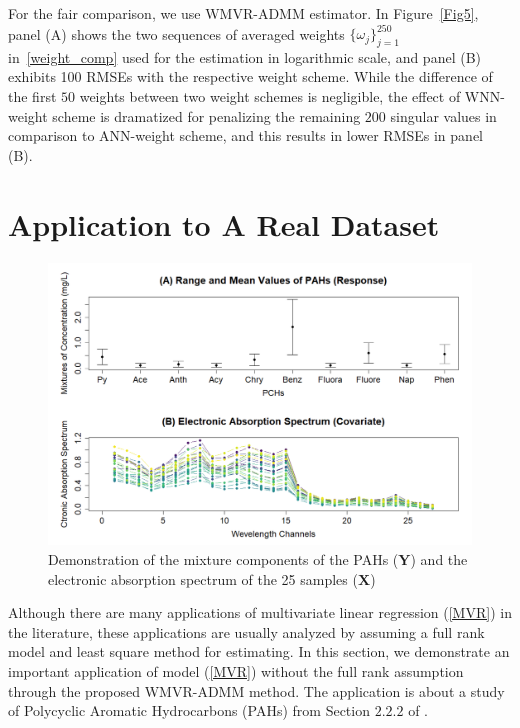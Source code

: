 \documentclass[alpha-refs]{wiley-article}
\begin{document}
For the fair comparison, we use WMVR-ADMM estimator.
In Figure~\ref{Fig5}, panel (A) shows the two sequences of averaged weights $\{\omega_{j}\}_{j=1}^{250}$ in~\eqref{weight_comp} used for the estimation in logarithmic scale,
and panel (B) exhibits 100 RMSEs with the respective weight scheme.
While the difference of the first $50$ weights between two weight schemes is negligible, the effect of WNN-weight scheme is dramatized for penalizing the remaining $200$ singular values in comparison to ANN-weight scheme, and this results in lower RMSEs in panel (B).

\section{Application to A Real Dataset}

\begin{figure}[b!]
    \centering
    \includegraphics[width = 120mm]{Figure/S6_P1.pdf}
    \caption{Demonstration of the mixture components of the PAHs ($\boldsymbol{Y}$) and the electronic absorption spectrum of the 25 samples ($\boldsymbol{X}$)}
    \label{fig:Realdata_XY}
\end{figure}

Although there are many applications of multivariate linear regression (\ref{MVR}) in the literature, these applications are usually analyzed by assuming a full rank model and least square method for estimating.
In this section, we demonstrate an important application of model (\ref{MVR}) without the full rank assumption through the proposed WMVR-ADMM method.
The application is about a study of Polycyclic Aromatic Hydrocarbons (PAHs) from Section $2.2.2$ of \citet{isenmann2008modern}.
\end{document}
